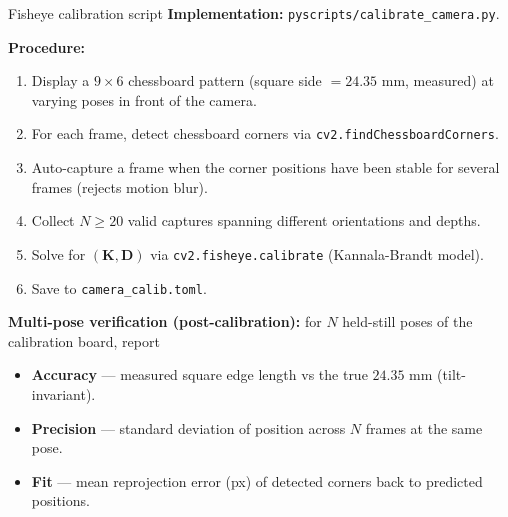 \documentclass[10pt,aspectratio=169]{beamer}
\begin{document}
\begin{frame}{Fisheye calibration script}
\textbf{Implementation:} \texttt{pyscripts/calibrate\_camera.py}.

\textbf{Procedure:}
\begin{enumerate}
    \item Display a $9 \times 6$ chessboard pattern (square side $= 24.35$ mm, measured) at varying poses in front of the camera.
    \item For each frame, detect chessboard corners via \texttt{cv2.findChessboardCorners}.
    \item Auto-capture a frame when the corner positions have been stable for several frames (rejects motion blur).
    \item Collect $N \ge 20$ valid captures spanning different orientations and depths.
    \item Solve for $(\mathbf{K}, \mathbf{D})$ via \texttt{cv2.fisheye.calibrate} (Kannala-Brandt model).
    \item Save to \texttt{camera\_calib.toml}.
\end{enumerate}

\textbf{Multi-pose verification (post-calibration):} for $N$ held-still poses of the calibration board, report
\begin{itemize}
    \item \textbf{Accuracy} --- measured square edge length vs the true $24.35$ mm (tilt-invariant).
    \item \textbf{Precision} --- standard deviation of position across $N$ frames at the same pose.
    \item \textbf{Fit} --- mean reprojection error (px) of detected corners back to predicted positions.
\end{itemize}
\end{frame}
\end{document}
